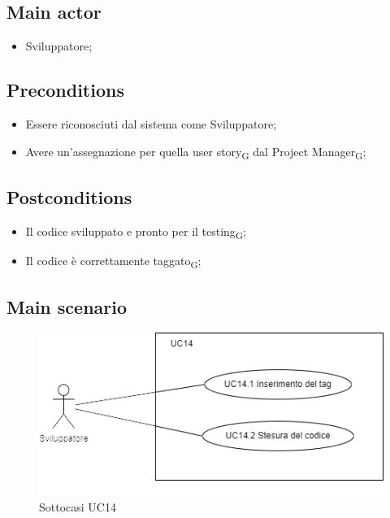 \documentclass{article}
\begin{document}
    \subsection*{Main actor}
        \begin{itemize}
            \item Sviluppatore;
        \end{itemize}
    
    \subsection*{Preconditions}
        \begin{itemize}
            \item Essere riconosciuti dal sistema come Sviluppatore;
            \item Avere un'assegnazione per quella user story\textsubscript{G} dal Project Manager\textsubscript{G};
        \end{itemize}
        
    \subsection*{Postconditions} 
        \begin{itemize}
            \item Il codice sviluppato e pronto per il testing\textsubscript{G};
            \item Il codice è correttamente taggato\textsubscript{G};  
        \end{itemize}
    
    \subsection*{Main scenario}
        \begin{figure}[h]
          \centering
          \includegraphics{./imgUML/UC14-zoom.png}
          \caption{Sottocasi UC14}
          \label{fig:UC14_sottocasi}
        \end{figure}
        
\end{document}
